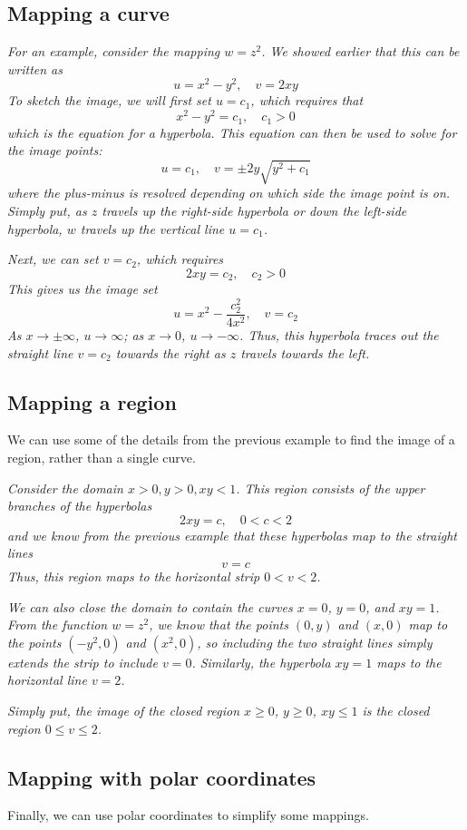 \documentclass{article}
\begin{document}
\subsection{Mapping a curve}
\textit{For an example, consider the mapping $w = z^2$. We showed earlier that this can be written as
\[
	u = x^2 - y^2, \quad v = 2xy
\]
To sketch the image, we will first set $u = c_1$, which requires that
\[
	x^2 - y^2 = c_1, \quad c_1 > 0
\]
which is the equation for a hyperbola. This equation can then be used to solve for the image points:
\[
	u = c_1, \quad v = \pm2y\sqrt{y^2 + c_1}
\]
where the plus-minus is resolved depending on which side the image point is on. Simply put, as $z$ travels up the right-side hyperbola or down the left-side hyperbola, $w$ travels up the vertical line $u = c_1$.
}

\textit{
Next, we can set $v = c_2$, which requires
\[
	2xy = c_2, \quad c_2 > 0
\]
This gives us the image set
\[
	u = x^2 - \frac{c_2^2}{4x^2}, \quad v = c_2
\]
As $x \to \pm\infty$, $u \to \infty$; as $x \to 0$, $u \to -\infty$. Thus, this hyperbola traces out the straight line $v = c_2$ towards the right as $z$ travels towards the left.
}

\subsection{Mapping a region}
We can use some of the details from the previous example to find the image of a region, rather than a single curve.

\textit{Consider the domain $x > 0, y > 0, xy < 1$. This region consists of the upper branches of the hyperbolas
\[
	2xy = c, \quad 0 < c < 2
\]
and we know from the previous example that these hyperbolas map to the straight lines
\[
	v = c
\]
Thus, this region maps to the horizontal strip $0 < v < 2$.
}

\textit{We can also close the domain to contain the curves $x = 0$, $y = 0$, and $xy = 1$. From the function $w = z^2$, we know that the points $(0, y)$ and $(x, 0)$ map to the points $(-y^2, 0)$ and $(x^2, 0)$, so including the two straight lines simply extends the strip to include $v = 0$. Similarly, the hyperbola $xy = 1$ maps to the horizontal line $v = 2$.}

\textit{Simply put, the image of the closed region $x \ge 0$, $y \ge 0$, $xy \le 1$ is the closed region $0 \le v \le 2$.}


\subsection{Mapping with polar coordinates}
Finally, we can use polar coordinates to simplify some mappings. 
\end{document}
